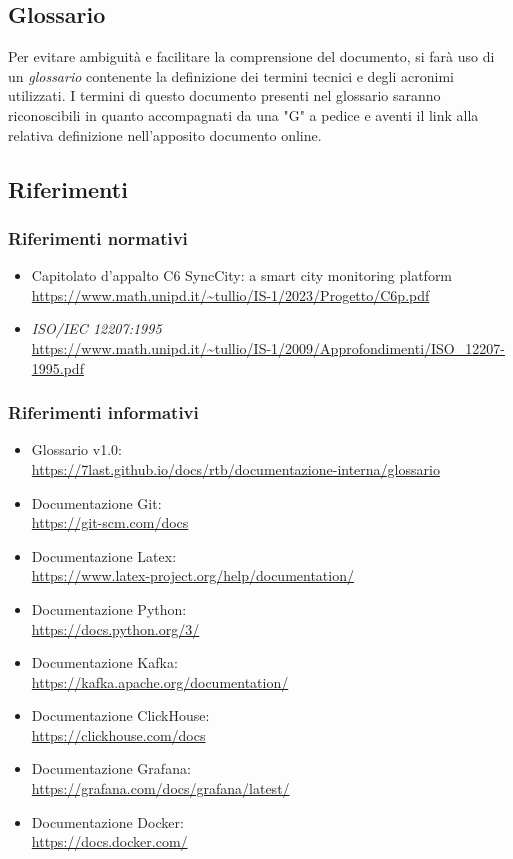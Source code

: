 \subsection{Glossario}
Per evitare ambiguità e facilitare la comprensione del documento, si farà uso di un \textit{glossario} contenente la definizione dei termini tecnici e degli acronimi utilizzati. I termini di questo documento presenti nel glossario saranno riconoscibili in quanto accompagnati da una "G" a pedice e aventi il link alla relativa definizione nell'apposito documento online.

\subsection{Riferimenti}
\subsubsection{Riferimenti normativi}
\begin{itemize}
	\item Capitolato d'appalto C6 SyncCity: a smart city monitoring platform \\ \url{https://www.math.unipd.it/~tullio/IS-1/2023/Progetto/C6p.pdf}
	\item \textit{ISO/IEC 12207:1995} \\ \url{https://www.math.unipd.it/~tullio/IS-1/2009/Approfondimenti/ISO_12207-1995.pdf}
\end{itemize}

\subsubsection{Riferimenti informativi}
\begin{itemize}
    \item Glossario v1.0:\\ \url{https://7last.github.io/docs/rtb/documentazione-interna/glossario}
    \item Documentazione Git:\\ \url{https://git-scm.com/docs}
    \item Documentazione Latex:\\ \url{https://www.latex-project.org/help/documentation/}
    \item Documentazione Python:\\ \url{https://docs.python.org/3/}
    \item Documentazione Kafka:\\ \url{https://kafka.apache.org/documentation/}
    \item Documentazione ClickHouse:\\ \url{https://clickhouse.com/docs}
    \item Documentazione Grafana:\\ \url{https://grafana.com/docs/grafana/latest/}
    \item Documentazione Docker:\\ \url{https://docs.docker.com/}
\end{itemize}